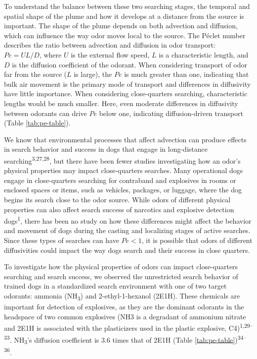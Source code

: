 \documentclass[
]{article}
\begin{document}
To understand the balance between these two searching stages, the temporal and spatial shape of the plume and how it develops at a distance from the source is important. The shape of the plume depends on both advection and diffusion, which can influence the way odor moves local to the source. The Péclet number describes the ratio between advection and diffusion in odor transport: \(Pe = UL/D\), where \(U\) is the external flow speed, \(L\) is a characteristic length, and \(D\) is the diffusion coefficient of the odorant. When considering transport of odor far from the source (\(L\) is large), the \(Pe\) is much greater than one, indicating that bulk air movement is the primary mode of transport and differences in diffusivity have little importance. When considering close-quarters searching, characteristic lengths would be much smaller. Here, even moderate differences in diffusivity between odorants can drive \(Pe\) below one, indicating diffusion-driven transport (Table \ref{tab:pe-table}).

We know that environmental processes that affect advection can produce effects in search behavior and success in dogs that engage in long-distance searching\textsuperscript{3,27,28}, but there have been fewer studies investigating how an odor's physical properties may impact close-quarters searches. Many operational dogs engage in close-quarters searching for contraband and explosives in rooms or enclosed spaces or items, such as vehicles, packages, or luggage, where the dog begins its search close to the odor source. While odors of different physical properties can also affect search success of narcotics and explosive detection dogs\textsuperscript{1}, there has been no study on how these differences might affect the behavior and movement of dogs during the casting and localizing stages of active searches. Since these types of searches can have \(Pe < 1\), it is possible that odors of different diffusivities could impact the way dogs search and their success in close quarters.

To investigate how the physical properties of odors can impact close-quarters searching and search success, we observed the unrestricted search behavior of trained dogs in a standardized search environment with one of two target odorants: ammonia (NH\textsubscript{3}) and 2-ethyl-1-hexanol (2E1H). These chemicals are important for detection of explosives, as they are the dominant odorants in the headspace of two common explosives (NH3 is a degradant of ammonium nitrate and 2E1H is associated with the plasticizers used in the plastic explosive, C4)\textsuperscript{1,29--33}. NH\textsubscript{3}'s diffusion coefficient is 3.6 times that of 2E1H (Table \ref{tab:pe-table})\textsuperscript{34--36}.
\end{document}
